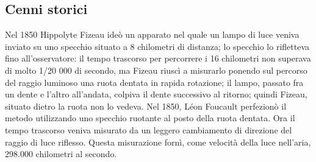 \subsection{Cenni storici}
Nel 1850 Hippolyte Fizeau ideò un apparato nel quale un lampo di luce veniva inviato su uno specchio situato a 8 chilometri di distanza; lo specchio lo rifletteva fino all'osservatore: il tempo trascorso per percorrere i 16 chilometri non superava di molto 1/20 000 di secondo, ma Fizeau riuscì a misurarlo ponendo sul percorso del raggio luminoso una ruota dentata in rapida rotazione; il lampo, passato fra un dente e l'altro all'andata, colpiva il dente successivo al ritorno; quindi Fizeau, situato dietro la ruota non lo vedeva.
Nel 1850, Léon Foucault perfezionò il metodo utilizzando uno specchio ruotante al posto della ruota dentata. Ora il tempo trascorso veniva misurato da un leggero cambiamento di direzione del raggio di luce riflesso. Questa misurazione fornì, come velocità della luce nell'aria, 298.000 chilometri al secondo.
